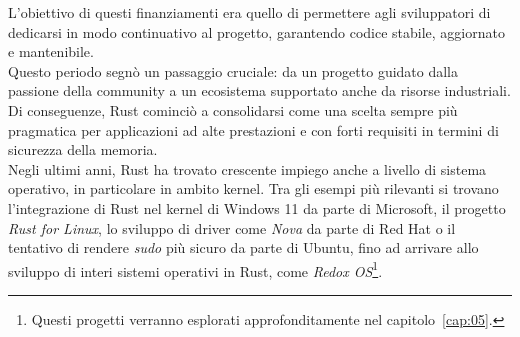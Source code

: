 L'obiettivo di questi finanziamenti era quello di permettere agli sviluppatori di dedicarsi in modo continuativo al progetto, garantendo
codice stabile, aggiornato e mantenibile. \hfill
\vspace{10pt}\\
\noindent Questo periodo segnò un passaggio cruciale: da un progetto guidato dalla passione della community a un ecosistema supportato anche
da risorse industriali. Di conseguenze, Rust cominciò a consolidarsi come una scelta sempre più pragmatica per applicazioni 
ad alte prestazioni e con forti requisiti in termini di sicurezza della memoria. \hfill
\vspace{15pt}\\
\noindent Negli ultimi anni, Rust ha trovato crescente impiego anche a livello di sistema operativo, in particolare in ambito kernel.
Tra gli esempi più rilevanti si trovano l'integrazione di Rust nel kernel di Windows 11 da parte di Microsoft,
il progetto \textit{Rust for Linux}, lo sviluppo di driver come \textit{Nova} da parte di Red Hat o il tentativo di rendere
\textit{sudo} più sicuro da parte di Ubuntu, fino ad arrivare allo sviluppo di interi sistemi operativi in Rust, come \textit{Redox OS}\footnote{Questi progetti verranno esplorati approfonditamente nel capitolo~\ref{cap:05}.}.